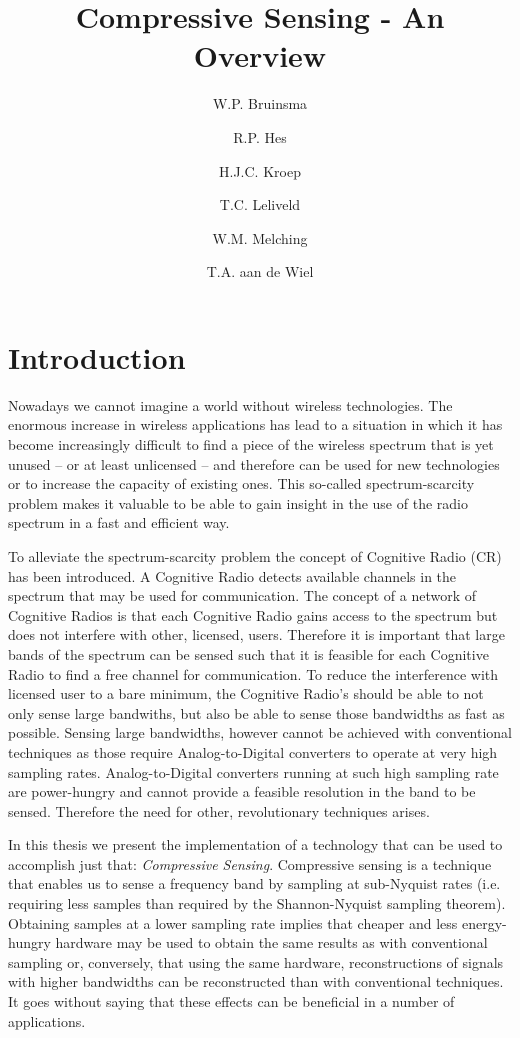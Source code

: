 \documentclass[a4paper, openany, oneside]{memoir}
\title{Compressive Sensing - An Overview}
\author{W.P. Bruinsma \and R.P. Hes \and H.J.C. Kroep \and T.C. Leliveld \and W.M. Melching \and T.A. aan de Wiel}
\begin{document}
\chapter{Introduction}
Nowadays we cannot imagine a world without wireless technologies. The enormous increase in wireless applications has lead to a situation in which it has become increasingly difficult to find a piece of the wireless spectrum that is yet unused -- or at least unlicensed -- and therefore can be used for new technologies or to increase the capacity of existing ones. This so-called spectrum-scarcity problem makes it valuable to be able to gain insight in the use of the radio spectrum in a fast and efficient way.

To alleviate the spectrum-scarcity problem the concept of Cognitive Radio (CR) has been introduced. A Cognitive Radio detects
available channels in the spectrum that may be used for communication. The concept of a network of Cognitive Radios is that each Cognitive Radio gains access to the spectrum but does not interfere with other, licensed, users. Therefore it is important that large bands of the spectrum can be sensed such that it is feasible for each Cognitive Radio to find a free channel for communication. To reduce the interference with licensed user to a bare minimum, the Cognitive Radio's should be able to not only sense large bandwiths, but also be able to sense those bandwidths as fast as possible. Sensing large bandwidths, however cannot be achieved with conventional techniques as those require Analog-to-Digital converters to operate at very high sampling rates. Analog-to-Digital converters running at such high sampling rate are power-hungry and cannot provide a feasible resolution in the band to be sensed. Therefore the need for other, revolutionary techniques arises.

In this thesis we present the implementation of a technology that can be used to accomplish just that: \emph{Compressive Sensing}. Compressive sensing is a technique that enables us to sense a frequency band by sampling at sub-Nyquist rates (i.e. requiring less samples than required by the Shannon-Nyquist sampling theorem).  Obtaining samples at a lower sampling rate implies that cheaper and less energy-hungry hardware may be used to obtain the same results as with conventional sampling or, conversely, that using the same hardware, reconstructions of signals with higher bandwidths can be reconstructed than with conventional techniques. It goes without saying that these effects can be beneficial in a number of applications.
\end{document}
